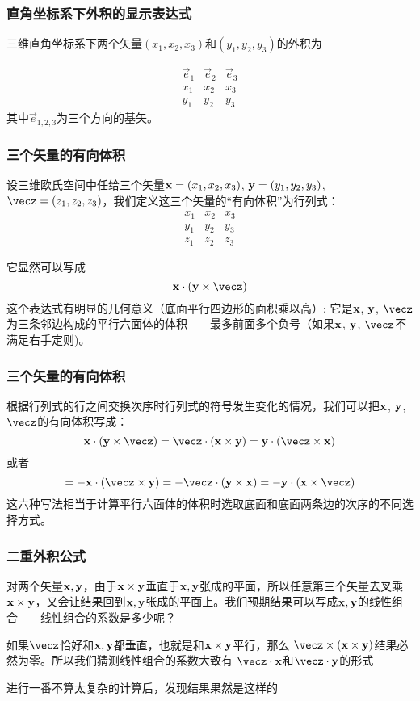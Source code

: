 \documentclass[CJK]{beamer}
\begin{document}
\begin{frame}
  \frametitle{直角坐标系下外积的显示表达式}
  三维直角坐标系下两个矢量$(x_1, x_2, x_3)$和$(y_1, y_2, y_3)$的外积为

  $$  \begin{array}{|ccc|}
    \vec{e}_1 & \vec{e}_2 & \vec{e}_3 \\
    x_1 & x_2 & x_3 \\
    y_1 & y_2 & y_3
  \end{array}  $$
  其中$\vec{e}_{1,2,3}$为三个方向的基矢。
\end{frame}

\begin{frame}
  \frametitle{三个矢量的有向体积}
  设三维欧氏空间中任给三个矢量${\mathbf{x}} = (x_1,x_2,x_3)$, ${\mathbf{y}} = (y_1,y_2,y_3)$, $\vecz = (z_1,z_2,z_3)$，我们定义这三个矢量的“有向体积”为行列式：  
  $$  \begin{array}{|ccc|}
    x_1 & x_2 & x_3 \\
    y_1 & y_2 & y_3 \\
    z_1 & z_2 & z_3 
  \end{array}  $$
  
  它显然可以写成
  $$ \vecx \cdot (\vecy \times \vecz) $$
  这个表达式有明显的几何意义（底面平行四边形的面积乘以高）: 它是${\mathbf{x}}$, ${\mathbf{y}}$, $\vecz$为三条邻边构成的平行六面体的体积——最多前面多个负号（如果${\mathbf{x}}$, ${\mathbf{y}}$, $\vecz$不满足右手定则)。
\end{frame}

\begin{frame}
  \frametitle{三个矢量的有向体积}
  根据行列式的行之间交换次序时行列式的符号发生变化的情况，我们可以把${\mathbf{x}}$, ${\mathbf{y}}$, $\vecz$的有向体积写成：
  $$ \vecx \cdot (\vecy \times \vecz) = \vecz\cdot (\vecx\times\vecy) = \vecy \cdot(\vecz\times\vecx) $$
  或者
  $$ = - \vecx \cdot (\vecz \times \vecy) = -\vecz \cdot (\vecy\times\vecx) = -\vecy \cdot(\vecx\times\vecz) $$  
  这六种写法相当于计算平行六面体的体积时选取底面和底面两条边的次序的不同选择方式。
\end{frame}

\begin{frame}
  \frametitle{二重外积公式}
  对两个矢量${\mathbf{x}}, {\mathbf{y}}$，由于${\mathbf{x}}\times{\mathbf{y}}$垂直于${\mathbf{x}},{\mathbf{y}}$张成的平面，所以任意第三个矢量去叉乘${\mathbf{x}}\times {\mathbf{y}}$，又会让结果回到${\mathbf{x}},{\mathbf{y}}$张成的平面上。我们预期结果可以写成${\mathbf{x}},{\mathbf{y}}$的线性组合——线性组合的系数是多少呢？

  \skipline
  
  如果$\vecz$恰好和${\mathbf{x}},{\mathbf{y}}$都垂直，也就是和${\mathbf{x}}\times{\mathbf{y}}$平行，那么
  $\vecz\times(\vecx\times \vecy)$结果必然为零。所以我们猜测线性组合的系数大致有
  $\vecz\cdot\vecx$和$\vecz\cdot\vecy$的形式

  \skipline
  
  进行一番不算太复杂的计算后，发现结果果然是这样的
  \tbox{$$\vecz\times(\vecx\times \vecy) = (\vecy\cdot\vecz)\vecx - (\vecx\cdot \vecz)\vecy $$}

\end{frame}
\end{document}
